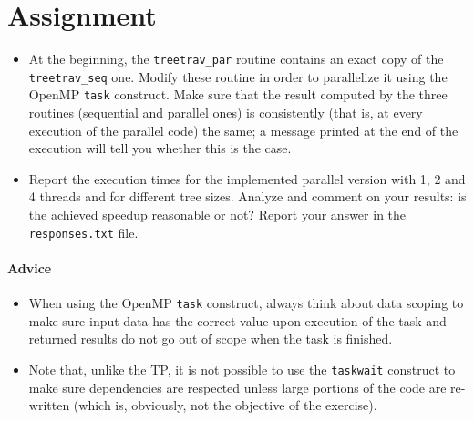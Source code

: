 \documentclass{article}
\begin{document}
\section{Assignment}
\begin{itemize}
\item {\huge \Keyboard} At the beginning, the \texttt{treetrav\_par}
  routine contains an exact copy of the \texttt{treetrav\_seq}
  one. Modify these routine in order to parallelize it using the
  OpenMP \texttt{task} construct.
  Make sure that the result computed by the three routines (sequential
  and parallel ones) is consistently (that is, at every execution of
  the parallel code) the same; a message printed at the end of the
  execution will tell you whether this is the case.
\item \smallpencil Report the execution times for the implemented
  parallel version with 1, 2 and 4 threads and for different tree
  sizes. Analyze and comment on your results: is the achieved speedup
  reasonable or not? Report your answer in the \texttt{responses.txt}
  file.
\end{itemize}


\paragraph{Advice}
\begin{itemize}
\item When using the OpenMP \texttt{task} construct, always think
  about data scoping to make sure input data has the correct
  value upon execution of the task and returned results do not go out
  of scope when the task is finished.
\item Note that, unlike the TP, it is not possible to use the
  \texttt{taskwait} construct to make sure dependencies are respected
  unless large portions of the code are re-written (which is,
  obviously, not the objective of the exercise).
\end{itemize}
\end{document}
